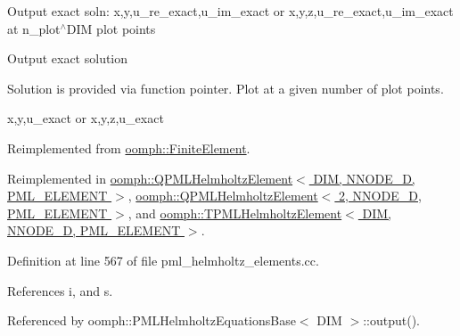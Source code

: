 Output exact soln\+: x,y,u\+\_\+re\+\_\+exact,u\+\_\+im\+\_\+exact or x,y,z,u\+\_\+re\+\_\+exact,u\+\_\+im\+\_\+exact at n\+\_\+plot$^\wedge$\+D\+IM plot points

Output exact solution

Solution is provided via function pointer. Plot at a given number of plot points.

x,y,u\+\_\+exact or x,y,z,u\+\_\+exact 

Reimplemented from \hyperlink{classoomph_1_1FiniteElement_a22b695c714f60ee6cd145be348042035}{oomph\+::\+Finite\+Element}.



Reimplemented in \hyperlink{classoomph_1_1QPMLHelmholtzElement_a1697955b637445b14882b28ff8467f6e}{oomph\+::\+Q\+P\+M\+L\+Helmholtz\+Element$<$ D\+I\+M, N\+N\+O\+D\+E\+\_\+D, P\+M\+L\+\_\+\+E\+L\+E\+M\+E\+N\+T $>$}, \hyperlink{classoomph_1_1QPMLHelmholtzElement_a1697955b637445b14882b28ff8467f6e}{oomph\+::\+Q\+P\+M\+L\+Helmholtz\+Element$<$ 2, N\+N\+O\+D\+E\+\_\+D, P\+M\+L\+\_\+\+E\+L\+E\+M\+E\+N\+T $>$}, and \hyperlink{classoomph_1_1TPMLHelmholtzElement_ad16e9353adb16154f2518ba37269d402}{oomph\+::\+T\+P\+M\+L\+Helmholtz\+Element$<$ D\+I\+M, N\+N\+O\+D\+E\+\_\+D, P\+M\+L\+\_\+\+E\+L\+E\+M\+E\+N\+T $>$}.



Definition at line 567 of file pml\+\_\+helmholtz\+\_\+elements.\+cc.



References i, and s.



Referenced by oomph\+::\+P\+M\+L\+Helmholtz\+Equations\+Base$<$ D\+I\+M $>$\+::output().

\mbox{\label{classoomph_1_1PMLHelmholtzEquationsBase_a5ecc9830498e4cc25a0898e676a8c0ef}} 

